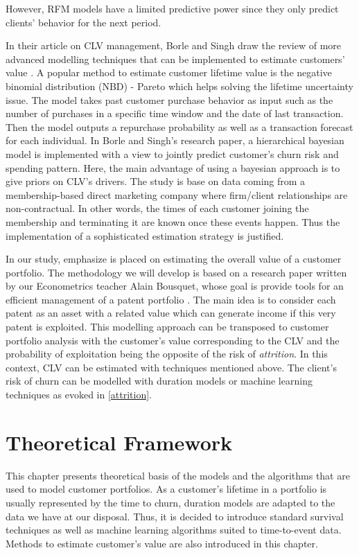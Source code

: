 \documentclass[
]{book}
\begin{document}
However, RFM models have a limited predictive power since they only predict clients' behavior for the next period.

In their article on CLV management, Borle and Singh draw the review of more advanced modelling techniques that can be implemented to estimate customers' value \citep{CLV_MEASUREMENT}. A popular method to estimate customer lifetime value is the negative binomial distribution (NBD) - Pareto \citep{CLV_NBD} which helps solving the lifetime uncertainty issue. The model takes past customer purchase behavior as input such as the number of purchases in a specific time window and the date of last transaction. Then the model outputs a repurchase probability as well as a transaction forecast for each individual. In Borle and Singh's research paper, a hierarchical bayesian model is implemented with a view to jointly predict customer's churn risk and spending pattern. Here, the main advantage of using a bayesian approach is to give priors on CLV's drivers. The study is base on data coming from a membership-based direct marketing company where firm/client relationships are non-contractual. In other words, the times of each customer joining the membership and terminating it are known once these events happen. Thus the implementation of a sophisticated estimation strategy is justified.

In our study, emphasize is placed on estimating the overall value of a customer portfolio. The methodology we will develop is based on a research paper written by our Econometrics teacher Alain Bousquet, whose goal is provide tools for an efficient management of a patent portfolio \citep{BREVETS}. The main idea is to consider each patent as an asset with a related value which can generate income if this very patent is exploited. This modelling approach can be transposed to customer portfolio analysis with the customer's value corresponding to the CLV and the probability of exploitation being the opposite of the risk of \emph{attrition}. In this context, CLV can be estimated with techniques mentioned above. The client's risk of churn can be modelled with duration models or machine learning techniques as evoked in \ref{attrition}.

\hypertarget{framework}{%
\chapter{Theoretical Framework}\label{framework}}

This chapter presents theoretical basis of the models and the algorithms that are used to model customer portfolios. As a customer's lifetime in a portfolio is usually represented by the time to churn, duration models are adapted to the data we have at our disposal. Thus, it is decided to introduce standard survival techniques as well as machine learning algorithms suited to time-to-event data. Methods to estimate customer's value are also introduced in this chapter.
\end{document}
